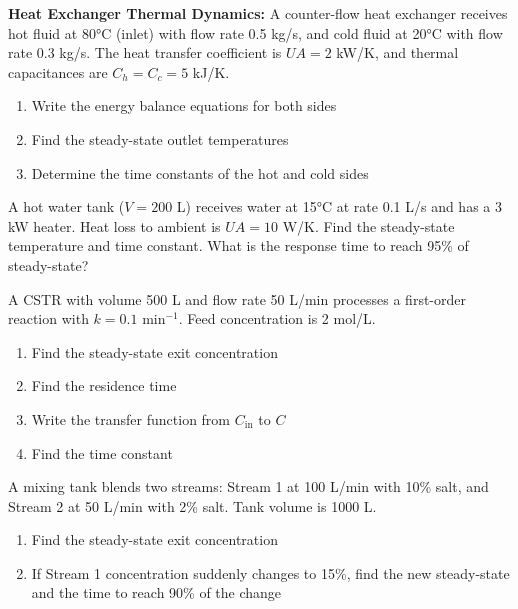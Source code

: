 \begin{exercise}
\textbf{Heat Exchanger Thermal Dynamics:} A counter-flow heat exchanger receives hot fluid at 80°C (inlet) with flow rate 0.5 kg/s, and cold fluid at 20°C with flow rate 0.3 kg/s. The heat transfer coefficient is $UA = 2$ kW/K, and thermal capacitances are $C_h = C_c = 5$ kJ/K.
\begin{enumerate}[label=(\alph*)]
    \item Write the energy balance equations for both sides
    \item Find the steady-state outlet temperatures
    \item Determine the time constants of the hot and cold sides
\end{enumerate}
\end{exercise}

\begin{exercise}
A hot water tank ($V = 200$ L) receives water at 15°C at rate 0.1 L/s and has a 3 kW heater. Heat loss to ambient is $UA = 10$ W/K. Find the steady-state temperature and time constant. What is the response time to reach 95\% of steady-state?
\end{exercise}


\begin{exercise}
A CSTR with volume 500 L and flow rate 50 L/min processes a first-order reaction with $k = 0.1$ min$^{-1}$. Feed concentration is 2 mol/L.
\begin{enumerate}[label=(\alph*)]
    \item Find the steady-state exit concentration
    \item Find the residence time
    \item Write the transfer function from $C_{\text{in}}$ to $C$
    \item Find the time constant
\end{enumerate}
\end{exercise}

\begin{exercise}
A mixing tank blends two streams: Stream 1 at 100 L/min with 10\% salt, and Stream 2 at 50 L/min with 2\% salt. Tank volume is 1000 L.
\begin{enumerate}[label=(\alph*)]
    \item Find the steady-state exit concentration
    \item If Stream 1 concentration suddenly changes to 15\%, find the new steady-state and the time to reach 90\% of the change
\end{enumerate}
\end{exercise}


